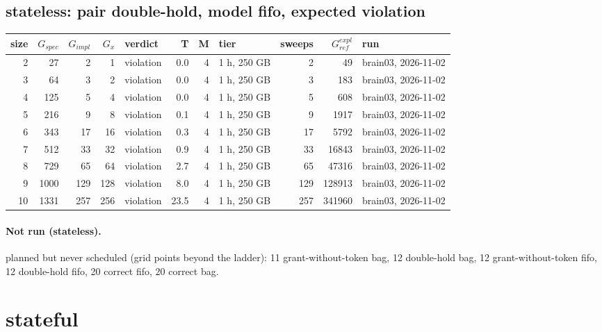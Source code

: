 \documentclass[10pt]{article}
\begin{document}
\subsection*{stateless: pair \textsf{double-hold}, model fifo, expected violation}
\begin{longtable}{@{}rrrrlrrlrrl@{}}
\toprule
size & $G_{\mathit{spec}}$ & $G_{\mathit{impl}}$ & $G_x$ & verdict & T & M & tier & sweeps & $G_{\mathit{ref}}^{\mathit{expl}}$ & run \\
\midrule
\endhead
\color{blue} 2 & 27 & 2 & 1 & violation & 0.0 & 4 & 1 h, 250 GB & 2 & 49 & brain03, 2026-11-02 \\
\color{blue} 3 & 64 & 3 & 2 & violation & 0.0 & 4 & 1 h, 250 GB & 3 & 183 & brain03, 2026-11-02 \\
\color{blue} 4 & 125 & 5 & 4 & violation & 0.0 & 4 & 1 h, 250 GB & 5 & 608 & brain03, 2026-11-02 \\
\color{blue} 5 & 216 & 9 & 8 & violation & 0.1 & 4 & 1 h, 250 GB & 9 & 1917 & brain03, 2026-11-02 \\
\color{blue} 6 & 343 & 17 & 16 & violation & 0.3 & 4 & 1 h, 250 GB & 17 & 5792 & brain03, 2026-11-02 \\
\color{blue} 7 & 512 & 33 & 32 & violation & 0.9 & 4 & 1 h, 250 GB & 33 & 16843 & brain03, 2026-11-02 \\
\color{blue} 8 & 729 & 65 & 64 & violation & 2.7 & 4 & 1 h, 250 GB & 65 & 47316 & brain03, 2026-11-02 \\
\color{blue} 9 & 1000 & 129 & 128 & violation & 8.0 & 4 & 1 h, 250 GB & 129 & 128913 & brain03, 2026-11-02 \\
\color{blue} 10 & 1331 & 257 & 256 & violation & 23.5 & 4 & 1 h, 250 GB & 257 & 341960 & brain03, 2026-11-02 \\
\bottomrule
\end{longtable}
\paragraph{Not run (stateless).}
planned but never scheduled (grid points beyond the ladder): 11 grant-without-token bag, 12 double-hold bag, 12 grant-without-token fifo, 12 double-hold fifo, 20 correct fifo, 20 correct bag.\par
\section*{stateful}
\end{document}
